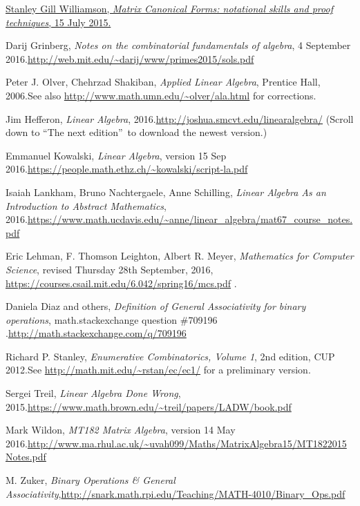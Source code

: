 \documentclass[numbers=enddot,12pt,final,onecolumn,notitlepage]{scrartcl}%
\theoremstyle{definition}
\begin{document}
\begin{thebibliography}{9999999999}
%
\href{http://cseweb.ucsd.edu/~gill/CILASite/Resources/LinearAlgebra.pdf}{Stanley
Gill Williamson, \textit{Matrix Canonical Forms: notational skills and proof
techniques}, 15 July 2015.}

Darij Grinberg, \textit{Notes on the combinatorial
fundamentals of algebra}, 4 September 2016.\newline\url{http://web.mit.edu/~darij/www/primes2015/sols.pdf}

Peter J. Olver, Chehrzad Shakiban, \textit{Applied
Linear Algebra}, Prentice Hall, 2006.\newline See also
\url{http://www.math.umn.edu/~olver/ala.html} for corrections.

Jim Hefferon, \textit{Linear Algebra},
2016.\newline\url{http://joshua.smcvt.edu/linearalgebra/} (Scroll down to
\textquotedblleft The next edition\textquotedblright\ to download the newest version.)

Emmanuel Kowalski, \textit{Linear Algebra},
version 15 Sep 2016.\newline\url{https://people.math.ethz.ch/~kowalski/script-la.pdf}

Isaiah Lankham, Bruno Nachtergaele, Anne
Schilling, \textit{Linear Algebra As an Introduction to Abstract Mathematics},
2016.\newline\url{https://www.math.ucdavis.edu/~anne/linear_algebra/mat67_course_notes.pdf}

Eric Lehman, F. Thomson Leighton, Albert R. Meyer,
\textit{Mathematics for Computer Science}, revised Thursday 28th September,
2016, \newline\url{https://courses.csail.mit.edu/6.042/spring16/mcs.pdf} .

Daniela Diaz and others, \textit{Definition of
General Associativity for binary operations}, math.stackexchange question
\#709196 .\newline\url{http://math.stackexchange.com/q/709196}

Richard P. Stanley, \textit{Enumerative
Combinatorics, Volume 1}, 2nd edition, CUP 2012.\newline See
\url{http://math.mit.edu/~rstan/ec/ec1/} for a preliminary version.

Sergei Treil, \textit{Linear Algebra Done Wrong},
2015.\newline\url{https://www.math.brown.edu/~treil/papers/LADW/book.pdf}

Mark Wildon, \textit{MT182 Matrix Algebra},
version 14 May 2016.\newline\url{http://www.ma.rhul.ac.uk/~uvah099/Maths/MatrixAlgebra15/MT1822015Notes.pdf}

M. Zuker, \textit{Binary Operations \& General
Associativity},\newline\url{http://snark.math.rpi.edu/Teaching/MATH-4010/Binary_Ops.pdf}
\end{thebibliography}
\end{document}
